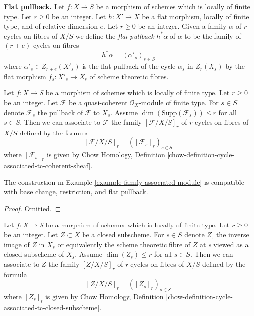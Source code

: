 \medskip\noindent
{\bf Flat pullback.} Let $f : X \to S$ be a morphism of schemes which is locally
of finite type. Let $r \geq 0$ be an integer. Let $h : X' \to X$ be a
flat morphism, locally of finite type, and of relative dimension $e$.
Let $r \geq 0$ be an integer. Given a family $\alpha$ of $r$-cycles
on fibres of $X/S$ we define the {\it flat pullback} $h^*\alpha$ of $\alpha$
to be the family of $(r + e)$-cycles on fibres
$$
h^*\alpha = (\alpha'_s)_{s \in S}
$$
where $\alpha'_s \in Z_{r + e}(X'_s)$ is the flat pullback
of the cycle $\alpha_s$ in $Z_r(X_s)$ by the flat morphism
$f_s : X'_s \to X_s$
of scheme theoretic fibres.

\begin{example}
\label{example-family-associated-module}
Let $f : X \to S$ be a morphism of schemes which is locally of finite type.
Let $r \geq 0$ be an integer. Let $\mathcal{F}$ be a quasi-coherent
$\mathcal{O}_X$-module of finite type. For $s \in S$ denote $\mathcal{F}_s$
the pullback of $\mathcal{F}$ to $X_s$.
Assume $\dim(\text{Supp}(\mathcal{F}_s)) \leq r$ for all $s \in S$.
Then we can associate to $\mathcal{F}$ the family $[\mathcal{F}/X/S]_r$ of
$r$-cycles on fibres of $X/S$ defined by the formula
$$
[\mathcal{F}/X/S]_r = ([\mathcal{F}_s]_r)_{s \in S}
$$
where $[\mathcal{F}_s]_r$ is given by Chow Homology, Definition
\ref{chow-definition-cycle-associated-to-coherent-sheaf}.
\end{example}

\begin{lemma}
\label{lemma-family-associated-module}
The construction in Example \ref{example-family-associated-module}
is compatible with base change, restriction,
and flat pullback.
\end{lemma}

\begin{proof}
Omitted.
\end{proof}

\begin{example}
\label{example-family-associated-closed}
Let $f : X \to S$ be a morphism of schemes which is locally of finite type.
Let $r \geq 0$ be an integer. Let $Z \subset X$ be a closed subscheme.
For $s \in S$ denote $Z_s$ the inverse image of $Z$ in $X_s$
or equivalently the scheme theoretic fibre of $Z$ at $s$ viewed
as a closed subscheme of $X_s$.
Assume $\dim(Z_s) \leq r$ for all $s \in S$.
Then we can associate to $Z$ the family $[Z/X/S]_r$
of $r$-cycles on fibres of $X/S$ defined by the formula
$$
[Z/X/S]_r = ([Z_s]_r)_{s \in S}
$$
where $[Z_s]_r$ is given by
Chow Homology, Definition
\ref{chow-definition-cycle-associated-to-closed-subscheme}.
\end{example}

